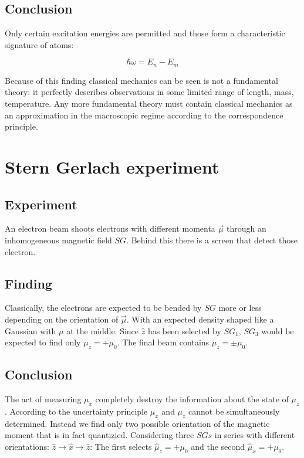   \subsection{Conclusion}
  Only certain excitation energies are permitted and those form a characteristic signature of atoms:

  $$\hbar\omega = E_n-E_m$$

  Because of this finding classical mechanics can be seen is not a fundamental theory: it perfectly describes observations in some limited range of length, mass, temperature.
  Any more fundamental theory must contain classical mechanics as an approximation in the macroscopic regime according to the correspondence principle.

\section{Stern Gerlach experiment}

  \subsection{Experiment}
  An electron beam shoots electrons with different momenta $\vec{\mu}$ through an inhomogeneous magnetic field $SG$.
  Behind this there is a screen that detect those electron.

  \subsection{Finding}
  Classically, the electrons are expected to be bended by $SG$ more or less depending on the orientation of $\vec{\mu}$.
  With an expected density shaped like a Gaussian with $\mu$ at the middle.
  Since $\hat{z}$ has been selected by $SG_1$, $SG_3$ would  be expected to find only $\mu_z = + \mu_0$.
  The final beam contains $\mu_z =\pm \mu_0$.

  \subsection{Conclusion}
  The act of measuring $\mu_x$ completely destroy the information about the state of $\mu_z$.
  According to the uncertainty principle $\mu_x$ and $\mu_z$ cannot be simultaneously determined.
  Instead we find only two possible orientation of the magnetic moment that is in fact quantizied.
  Considering three $SGs$ in series with different orientations: $\hat{z}\rightarrow\hat{x}\rightarrow\hat{z}$:
  The first selects $\hat{\mu}_z = +\mu_0$ and the second $\hat{\mu}_x = +\mu_0$.
